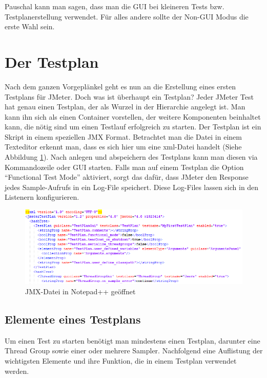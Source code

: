 \documentclass[a4paper,12pt]{article}
\begin{document}
Pauschal kann man sagen, dass man die GUI bei kleineren Tests bzw. Testplanerstellung verwendet. Für alles andere sollte der Non-GUI Modus die erste Wahl sein.

\section{Der Testplan}
Nach dem ganzen Vorgeplänkel geht es nun an die Erstellung eines ersten Testplans für JMeter.
Doch was ist überhaupt ein Testplan? Jeder JMeter Test hat genau einen Testplan, der als Wurzel in der Hierarchie angelegt ist. Man kann ihn sich als einen Container vorstellen, der weitere Komponenten beinhaltet kann, die nötig sind um einen Testlauf erfolgreich zu starten. Der Testplan ist ein Skript in einem speziellen JMX Format. Betrachtet man die Datei in einem Texteditor erkennt man, dass es sich hier um eine xml-Datei handelt (Siehe Abbildung \ref{fig:jmx_xml}). Nach anlegen und abspeichern des Testplans kann man diesen via Kommandozeile oder GUI starten. Falls man auf einem Testplan die Option "`Functional Test Mode"' aktiviert, sorgt das dafür, dass JMeter den Response jedes Sample-Aufrufs in ein Log-File speichert. Diese Log-Files lassen sich in den Listenern konfigurieren.

\begin{figure}[htb]%
 \centering
    \includegraphics[width=1\textwidth]{bilder/jmx_xml.png}
  \caption{JMX-Datei in Notepad++ geöffnet}
  \label{fig:jmx_xml}
\end{figure}

\subsection{Elemente eines Testplans}
Um einen Test zu starten benötigt man mindestens einen Testplan, darunter eine Thread Group sowie einer oder mehrere Sampler. Nachfolgend eine Auflistung der wichtigsten Elemente und ihre Funktion, die in einem Testplan verwendet werden.
\end{document}
